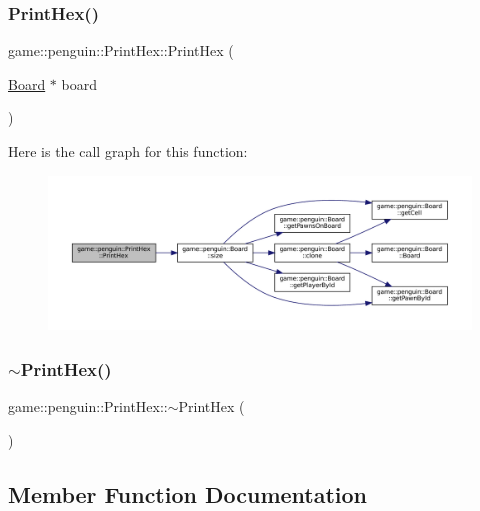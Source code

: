 \subsubsection{\texorpdfstring{Print\+Hex()}{PrintHex()}}
{\footnotesize\ttfamily game\+::penguin\+::\+Print\+Hex\+::\+Print\+Hex (\begin{DoxyParamCaption}\item[{\hyperlink{classgame_1_1penguin_1_1_board}{Board} $\ast$}]{board }\end{DoxyParamCaption})\hspace{0.3cm}{\ttfamily [explicit]}}

Here is the call graph for this function\+:
\nopagebreak
\begin{figure}[H]
\begin{center}
\leavevmode
\includegraphics[width=350pt]{classgame_1_1penguin_1_1_print_hex_acdb07dd749d832db180a0f42040e33ed_cgraph}
\end{center}
\end{figure}
\mbox{\label{classgame_1_1penguin_1_1_print_hex_a45fcb3f28b57d867ee835b957c323bc6}} 
\subsubsection{\texorpdfstring{$\sim$\+Print\+Hex()}{~PrintHex()}}
{\footnotesize\ttfamily game\+::penguin\+::\+Print\+Hex\+::$\sim$\+Print\+Hex (\begin{DoxyParamCaption}{ }\end{DoxyParamCaption})}



\subsection{Member Function Documentation}
\mbox{\label{classgame_1_1penguin_1_1_print_hex_a87a58be4fea97f043e6dbe01a3045c1d}} 
